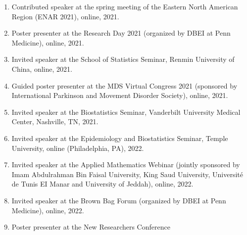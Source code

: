 \documentclass[12pt,letterpaper]{article}
\newenvironment{cventry}{\begin{minipage}[t]{\linewidth}}{\end{minipage}}
\begin{document}
\begin{enumerate}
		\item\begin{cventry} Contributed speaker at the spring meeting of the Eastern North American Region (ENAR 2021), online, 2021.
		\par\end{cventry}
		\item\begin{cventry} Poster presenter at the Research Day 2021 (organized by DBEI at Penn Medicine), online, 2021.
		\par\end{cventry}
		\item\begin{cventry} Invited speaker at the School of Statistics Seminar, 
		Renmin University of China, online, 2021.
		\par\end{cventry}
		\item\begin{cventry} Guided poster presenter at the MDS Virtual Congress 
		2021 (sponsored by International Parkinson and Movement 
		Disorder Society), online, 2021.
		\par\end{cventry}
		\item\begin{cventry} Invited speaker at the Biostatistics Seminar, 
		Vanderbilt University Medical Center, Nashville, TN, 2021.
		\par\end{cventry}
		\item\begin{cventry} Invited speaker at the Epidemiology and Biostatistics 
		Seminar, Temple University, online (Philadelphia, PA), 2022.
		\par\end{cventry}
		\item\begin{cventry} Invited speaker at the Applied Mathematics Webinar 
		(jointly sponsored by Imam Abdulrahman Bin Faisal University, King Saud University, Universit\'{e} de Tunis EI Manar and University of Jeddah), online, 2022.
		\par\end{cventry}
		\item\begin{cventry} Invited speaker at the Brown Bag Forum (organized by DBEI at Penn Medicine), online, 2022.
		\par\end{cventry}
		\item\begin{cventry} Poster presenter at the New Researchers Conference 

\end{cventry}
\end{enumerate}
\end{document}
